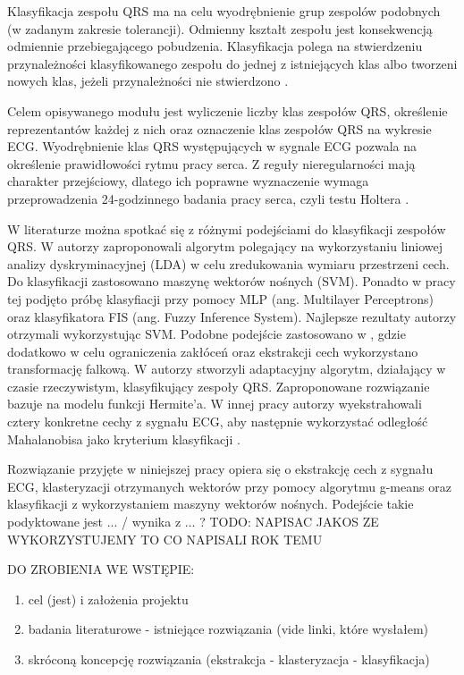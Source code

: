 \qquad Klasyfikacja zespołu QRS ma na celu wyodrębnienie grup zespolów podobnych (w zadanym zakresie tolerancji). Odmienny kształt zespołu jest konsekwencją odmiennie przebiegającego pobudzenia. Klasyfikacja polega na stwierdzeniu przynależności klasyfikowanego zespołu do jednej z istniejących klas albo tworzeni nowych klas, jeżeli przynależności nie stwierdzono \cite{Augustyniak}.

\qquad Celem opisywanego modułu jest wyliczenie liczby klas zespołów QRS, określenie reprezentantów każdej z nich oraz oznaczenie klas zespołów QRS na wykresie ECG. Wyodrębnienie klas QRS występujących w sygnale ECG pozwala na określenie prawidłowości rytmu pracy serca. Z reguły nieregularności mają charakter przejściowy, dlatego ich poprawne wyznaczenie wymaga przeprowadzenia 24-godzinnego badania pracy serca, czyli testu Holtera \cite{RaportKoncowy}.

\qquad W literaturze można spotkać się z różnymi podejściami do klasyfikacji zespołów QRS. W \cite{SVMBasedArrhythmiaClassification} autorzy zaproponowali algorytm polegający na wykorzystaniu liniowej analizy dyskryminacyjnej (LDA) w celu zredukowania wymiaru przestrzeni cech. Do klasyfikacji zastosowano maszynę wektorów nośnych (SVM). Ponadto w pracy tej podjęto próbę klasyfiacji przy pomocy MLP (ang. Multilayer Perceptrons) oraz klasyfikatora FIS (ang. Fuzzy Inference System). Najlepsze rezultaty autorzy otrzymali wykorzystując SVM. Podobne podejście zastosowano w \cite{Abhishek}, gdzie dodatkowo w celu ograniczenia zakłóceń oraz ekstrakcji cech wykorzystano transformację falkową. 
W \cite{Laguna} autorzy stworzyli adaptacyjny algorytm, działający w czasie rzeczywistym, klasyfikujący zespoły QRS. Zaproponowane rozwiązanie bazuje na modelu funkcji Hermite'a. 
W innej pracy autorzy wyekstrahowali cztery konkretne cechy z sygnału ECG, aby następnie wykorzystać odległość Mahalanobisa jako kryterium klasyfikacji \cite{Moreas}.

\qquad Rozwiązanie przyjęte w niniejszej pracy opiera się o ekstrakcję cech z sygnału ECG, klasteryzacji otrzymanych wektorów przy pomocy algorytmu g-means oraz klasyfikacji z wykorzystaniem maszyny wektorów nośnych. Podejście takie podyktowane jest ... / wynika z ... ? TODO: NAPISAC JAKOS ZE WYKORZYSTUJEMY TO CO NAPISALI ROK TEMU


DO ZROBIENIA WE WSTĘPIE:
\begin{enumerate}
	\item cel (jest) i założenia projektu
	\item badania literaturowe - istniejące rozwiązania (vide linki, które wysłałem) 
	\item skróconą koncepcję rozwiązania (ekstrakcja - klasteryzacja - klasyfikacja)
\end{enumerate}